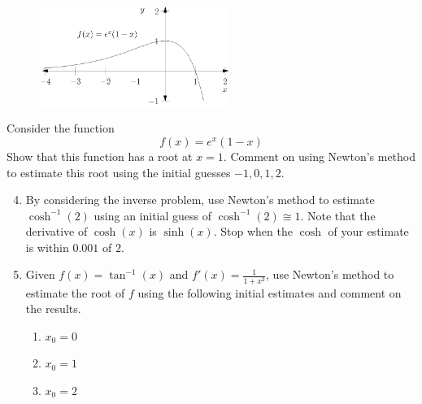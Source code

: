 \documentclass[11pt,a4paper,titlepage,oneside,openany]{article}
\numberwithin{equation}{section}
\numberwithin{algorithm}{section}
\numberwithin{figure}{section}
\numberwithin{table}{section}
\begin{document}
\begin{figure}
  \includegraphics[width=0.55\textwidth]{nm_func_1.eps}
\end{figure}
Consider the function
  \begin{equation*}
    f(x)=e^x(1-x)
  \end{equation*}
  Show that this function has a root at $x=1$. Comment on using Newton's method to estimate this root using the initial guesses ${-1,0,1,2}$.
\\
\begin{enumerate}
\setcounter{enumi}{3}
\item%
  By considering the inverse problem, use Newton's method to estimate $\cosh^{-1}(2)$ using an initial guess of $\cosh^{-1}(2)\cong 1$. Note that the derivative of $\cosh(x)$ is $\sinh(x)$. Stop when the $\cosh$ of your estimate is within $0.001$ of $2$.

\item
  Given $f(x)=\tan^{-1}(x)$ and $f'(x)=\frac{1}{1+x^2}$, use Newton's method to estimate the root of $f$ using the following initial estimates and comment on the results.
  \begin{multicols}{3}
    \begin{enumerate}
      \item $x_0=0$ \item $x_0=1$ \item $x_0=2$ 
    \end{enumerate}
  \end{multicols}
\end{enumerate}
\end{document}
